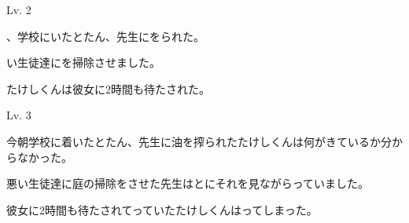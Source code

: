 	\begin{mondai}{Lv. 2}
		\item {}、学校にいたとたん、先生にをられた。
		\item {}い生徒達にを掃除させました。\vspace{7pt}
		\item たけしくんは彼女に2時間も待たされた。
	\end{mondai}

	\begin{mondai}{Lv. 3}
		\item 今朝学校に着いたとたん、先生に油を搾られたたけしくんは何がきているか分からなかった。
		\item 悪い生徒達に庭の掃除をさせた先生はと\hspace{10pt}にそれを見ながらっていました。
		\item 彼女に2時間も待たされてっていたたけしくんは\hspace{15pt}ってしまった。
	\end{mondai}
	

